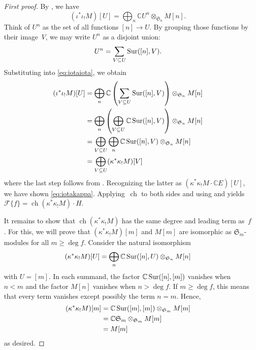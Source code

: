 \documentclass[11pt]{article}
\theoremstyle{definition}
\numberwithin{equation}{section}
\newcommand{\K}{\mathbb{C}}
\newcommand{\Sur}{\mathchoice{\operatorname{Sur}}{\operatorname{Sur}}{\mathrm{Sur}}{\mathrm{Sur}}}
\newcommand{\F}[1]{\mathscr{F}\{#1\}}
\newcommand{\Sym}{\mathfrak{S}}
\DeclareMathOperator{\ch}{ch}
\begin{document}
\begin{proof}[First proof]
By , we have
\begin{equation}\label{eq:iotaiota}
    (\iota^* \iota_! M)[U] = \bigoplus_n \K U^n \otimes_{\Sym_n} M[n].
\end{equation}
Think of $U^n$ as the set of all functions $[n] \to U$. By grouping those functions by their image~$V$, we may write $U^n$ as a disjoint union:
\[U^n = \sum_{V \subseteq U} \Sur([n], V).\]
Substituting into \eqref{eq:iotaiota}, we obtain
\begin{align*}
    (\iota^* \iota_! M)[U] &= \bigoplus_n \K \left(\sum_{V \subseteq U} \Sur([n], V)\right) \otimes_{\Sym_n} M[n] \\
    &= \bigoplus_n \left(\bigoplus_{V \subseteq U} \K\Sur([n], V)\right) \otimes_{\Sym_n} M[n] \\
    &= \bigoplus_{V \subseteq U} \bigoplus_n \K\Sur([n], V) \otimes_{\Sym_n} M[n] \\
    &= \bigoplus_{V \subseteq U} (\kappa^*\kappa_!M)[V]
\end{align*}
where the last step follows from \cite[Proposition~2.6.7]{MR3641124}. Recognizing the latter as $(\kappa^* \kappa_! M \cdot \K E)[U]$, we have shown \eqref{eq:iotakappa}. Applying~$\ch$ to both sides and using  and  yields $\F{f} = \ch(\kappa^* \kappa_!M) \cdot H$.

It remains to show that $\ch(\kappa^* \kappa_!M)$ has the same degree and leading term as~$f$. For this, we will prove that $(\kappa^* \kappa_!M)[m]$ and $M[m]$ are isomorphic as $\Sym_m$-modules for all $m \geq \deg f$. Consider the natural isomorphism \[(\kappa^*\kappa_!M)[U] = \bigoplus_n \K\Sur([n], U) \otimes_{\Sym_n} M[n]\] with $U = [m]$. In each summand, the factor $\K\Sur([n], [m])$ vanishes when $n < m$ and the factor $M[n]$ vanishes when $n > \deg f$. If $m \geq \deg f$, this means that every term vanishes except possibly the term $n = m$. Hence,
\begin{align*}
    (\kappa^*\kappa_!M)[m] &= \K\Sur([m], [m]) \otimes_{\Sym_m} M[m] \\
    &= \K\Sym_m \otimes_{\Sym_m} M[m] \\
    &= M[m]
\end{align*}
as desired.
\end{proof}
\end{document}
